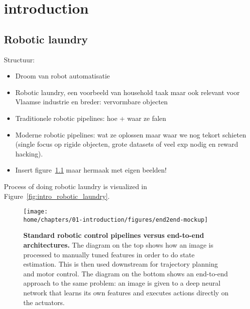 \documentclass[\home/main.tex]{subfiles}
\begin{document}

\chapter{introduction}\label{ch:introduction}


\section{Robotic laundry}
Structuur:
\begin{itemize}
    \item Droom van robot automatisatie
    \item Robotic laundry, een voorbeeld van household taak maar ook relevant voor Vlaamse industrie en breder: vervormbare objecten
    \item Traditionele robotic pipelines: hoe + waar ze falen
    \item Moderne robotic pipelines: wat ze oplossen maar waar we nog tekort schieten (single focus op rigide objecten, grote datasets of veel exp nodig en reward hacking).
    \item Insert figure~\ref{fig:intro_end2end} maar hermaak met eigen beelden!
\end{itemize}

Process of doing robotic laundry is visualized in Figure~\ref{fig:intro_robotic_laundry}.



\begin{figure}
    \texttt{[image: \\home/chapters/01-introduction/figures/end2end-mockup]}
    \caption{\textbf{Standard robotic control pipelines versus end-to-end architectures.} The diagram on the top shows how an image is processed to manually tuned features in order to do state estimation. This is then used downstream for trajectory planning and motor control. The diagram on the bottom shows an end-to-end approach to the same problem: an image is given to a deep neural network that learns its own features and executes actions directly on the actuators.}
    \label{fig:intro_end2end}
\end{figure}
\end{document}
